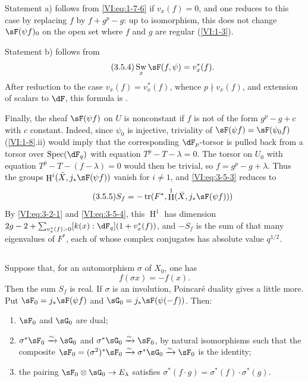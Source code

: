 \documentclass[12pt,oneside,english]{smfbook}
\DeclareMathOperator{\h}{H}
\DeclareMathOperator{\spec}{Spec}
\DeclareMathOperator{\swan}{Sw}
\DeclareMathOperator{\tr}{tr}
\newcommand{\iso}{\xrightarrow\sim}
\begin{document}
Statement a) follows from \eqref{VI:eq:1-7-6} if $v_x(f)=0$, and one reduces to this case by replacing $f$ by $f+g^p-g$: up to isomorphism, this does not change $\sF(\psi f)_0$ on the open set where $f$ and $g$ are regular (\ref{VI:1-3}).

Statement b) follows from
\begin{equation*}\tag{3.5.4}\label{VI:eq:3-5-4}
  \swan_x \sF(f,\psi) = v_x^\ast(f) \text{.}
\end{equation*}
After reduction to the case $v_x(f)=v_x^\ast(f)$, whence $p\nmid v_x(f)$, and extension of scalars to $\dF$, this formula is \cite[4.4]{se61}.

Finally, the sheaf $\sF(\psi f)$ on $U$ is nonconstant if $f$ is not of the form $g^p-g+c$ with $c$ constant. Indeed, since $\psi_0$ is injective, triviality of $\sF(\psi f)=\sF(\psi_0f)$ (\ref{VI:1-8}.ii) would imply that the corresponding $\dF_p$-torsor is pulled back from a torsor over $\spec(\dF_q)$ with equation $T^p-T-\lambda=0$. The torsor on $U_0$ with equation $T^p-T-(f-\lambda)=0$ would then be trivial, so $f=g^p-g+\lambda$. Thus the groups $\h^i(\bar X,j_*\sF(\psi f))$ vanish for $i\ne1$, and \eqref{VI:eq:3-5-3} reduces to
\begin{equation*}\tag{3.5.5}\label{VI:eq:3-5-5}
  S_f = -\tr(F^\ast,\h^1(\bar X,j_\ast \sF(\psi f)))
\end{equation*}
By \eqref{VI:eq:3-2-1} and \eqref{VI:eq:3-5-4}, this $\h^1$ has dimension $2g-2+\sum_{v_x^\ast(f)>0}[k(x):\dF_q](1+v_x^\ast(f))$, and $-S_f$ is the sum of that many eigenvalues of $F^\ast$, each of whose complex conjugates has absolute value $q^{1/2}$.

\subsection{}\label{VI:3-6}

Suppose that, for an automorphism $\sigma$ of $X_0$, one has
\[
  f(\sigma x) = - f(x) \text{.}
\]
Then the sum $S_f$ is real. If $\sigma$ is an involution, Poincaré duality gives a little more. Put $\sF_0=j_*\sF(\psi f)$ and $\sG_0=j_*\sF(\psi(-f))$. Then:
\begin{enumerate}[\indent a)]
  \item $\sF_0$ and $\sG_0$ are dual;
  \item $\sigma^\ast\sF_0\iso\sG_0$ and $\sigma^\ast\sG_0\iso\sF_0$, by natural isomorphisms such that the composite $\sF_0=(\sigma^2)^\ast\sF_0\iso\sigma^\ast\sG_0\iso\sF_0$ is the identity;
  \item the pairing $\sF_0\otimes\sG_0\to E_\lambda$ satisfies $\sigma^\ast(f\cdot g) = \sigma^\ast(f) \cdot \sigma^\ast (g)$.
\end{enumerate}
\end{document}
